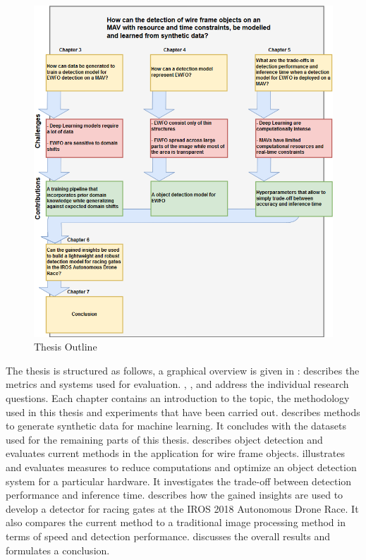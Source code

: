 \begin{figure}[hbtp]
	\centering
	\includegraphics[width=\textwidth]{fig/outline}
	\caption{Thesis Outline}
	\label{fig:outline}
\end{figure}


The thesis is structured as follows, a graphical overview is given in :  describes the metrics and systems used for evaluation. , ,  and  address the individual research questions. Each chapter contains an introduction to the topic, the methodology used in this thesis and experiments that have been carried out.  describes methods to generate synthetic data for machine learning. It concludes with the datasets used for the remaining parts of this thesis.   describes object detection and evaluates current methods in the application for wire frame objects.  illustrates and evaluates measures to reduce computations and optimize an object detection system for a particular hardware. It investigates the trade-off between detection performance and inference time.  describes how the gained insights are used to develop a detector for racing gates at the \ac{IROS} 2018 Autonomous Drone Race. It also compares the current method to a traditional image processing method in terms of speed and detection performance.  discusses the overall results and formulates a conclusion.




